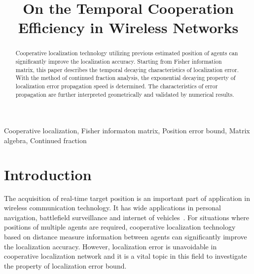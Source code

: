 \documentclass[conference]{IEEEtran}
\begin{document}
\title{On the Temporal Cooperation Efficiency in Wireless Networks}
\author{
}
\maketitle
\begin{abstract}
Cooperative localization technology utilizing previous estimated position of agents can significantly improve the localization accuracy.
Starting from Fisher information matrix, this paper describes the temporal decaying characteristics of localization error. 
With the method of continued fraction analysis, the exponential decaying property of localization error propagation speed is determined.
The characteristics of error propagation are further interpreted geometrically and validated by numerical results. 
\end{abstract}
\begin{IEEEkeywords}
Cooperative localization, Fisher informaton matrix, Position error bound, Matrix algebra, Continued fraction
\end{IEEEkeywords}
\maketitle



\section{Introduction}
The acquisition of real-time target position is an important part of application in wireless communication technology. 
It has wide applications in personal navigation, battlefield surveillance and internet of vehicles~\cite{Win2011Network}. 
For situations where positions of multiple agents are required, 
cooperative localization technology based on distance measure information between agents can significantly improve the localization accuracy. 
However, localization error is unavoidable in cooperative localization network 
and it is a vital topic in this field to investigate the property of localization error bound.
\end{document}
